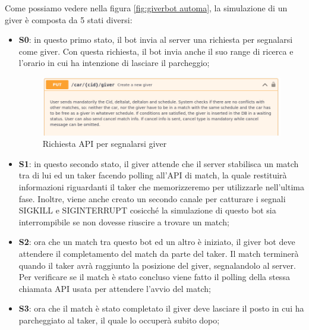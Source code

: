 \documentclass[main.tex]{subfiles}
\begin{document}
Come possiamo vedere nella figura \ref{fig:giverbot automa}, la simulazione di un giver è composta da 5 stati diversi:
\begin{itemize}
    \item \textbf{S0}: in questo primo stato, il bot invia al server una richiesta per segnalarsi come giver. Con questa richiesta, il bot invia anche il suo range di ricerca e l'orario in cui ha intenzione di lasciare il parcheggio; 
    \begin{figure}[H]
        \centering
        \includegraphics[width=1.1\linewidth]       {img/simulazione/giverbot/giver-request.png}
        \caption{Richiesta API per segnalarsi giver}
        \label{fig:giver request}
    \end{figure}
    


    \item \textbf{S1}: in questo secondo stato, il giver attende che il server stabilisca un match tra di lui ed un taker facendo polling all'API di match, la quale restituirà informazioni riguardanti il taker che memorizzeremo per utilizzarle nell'ultima fase. Inoltre, viene anche creato un secondo canale per catturare i segnali SIGKILL e SIGINTERRUPT cosicché la simulazione di questo bot sia interrompibile se non dovesse riuscire a trovare un match;

     
    
    \item \textbf{S2}: ora che un match tra questo bot ed un altro è iniziato, il giver bot deve attendere il completamento del match da parte del taker. Il match terminerà quando il taker avrà raggiunto la posizione del giver, segnalandolo al server. Per verificare se il match è stato concluso viene fatto il polling della stessa chiamata API usata per attendere l'avvio del match;

    
    
    \item \textbf{S3}: ora che il match è stato completato il giver deve lasciare il posto in cui ha parcheggiato al taker, il quale lo occuperà subito dopo;
    
    

\end{itemize}
\end{document}
